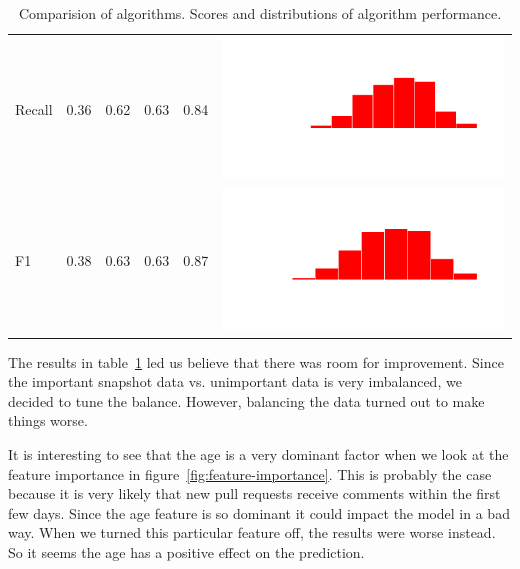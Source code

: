 \begin{table}
\begin{tabular}{lrrrrc}
    Recall & 0.36 & 0.62 & 0.63 & 0.84 & \includegraphics[scale = 0.1, clip = true, trim= 50px 60px 50px 60px]{../figs/hist-results/hist-RFrec.pdf} \\
    F1 & 0.38 & 0.63 & 0.63 & 0.87 & \includegraphics[scale = 0.1, clip = true, trim= 50px 60px 50px 60px]{../figs/hist-results/hist-RFf1.pdf} \\
    \hline
  \end{tabular}
  \caption[Comparision of algorithms]{Comparision of algorithms. Scores and distributions of algorithm performance.}
  \label{tab:alg-compare}
\end{table}

The results in table~\ref{tab:alg-compare} led us believe that there was room for improvement.
Since the important snapshot data vs. unimportant data is very imbalanced, we decided to tune the balance.
However, balancing the data turned out to make things worse.

It is interesting to see that the age is a very dominant factor when we look at the feature importance in figure~\ref{fig:feature-importance}.
This is probably the case because it is very likely that new pull requests receive comments within the first few days.
Since the age feature is so dominant it could impact the model in a bad way.
When we turned this particular feature off, the results were worse instead.
So it seems the age has a positive effect on the prediction.

